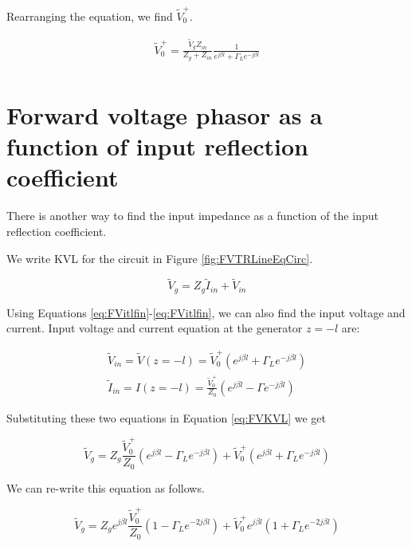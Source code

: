 \documentclass{ximera}
\begin{document}
Rearranging the equation, we find $\tilde{V}_0^+$.

\begin{eqnarray}
\tilde{V}_0^+= \frac{\tilde{V}_g Z_{in}}{Z_g + Z_{in}} \frac{1}{e^{j \beta l} + \Gamma_L e^{-j \beta l}} \\
\end{eqnarray}




\section{Forward voltage phasor as a function of input reflection coefficient}


There is another way to find the input impedance as a function of the input reflection coefficient.


We write KVL for the circuit in Figure \ref{fig:FVTRLineEqCirc}.

\begin{equation}
\tilde{V}_g=Z_g \tilde{I}_{in} + \tilde{V}_{in} \label{eq:FVKVL}
\end{equation}


Using Equations \ref{eq:FVitlfin}-\ref{eq:FVitlfin}, we can also find the input voltage and current.
Input voltage and current equation at the generator $z=-l$ are:


\begin{eqnarray}
\tilde{V}_{in}=\tilde{V}(z=-l)= \tilde{V}_0^+ (e^{j \beta l} + \Gamma_L  e^{-j \beta l } ) \\
\tilde{I}_{in}=I(z=-l)=   \frac{\tilde{V}_0^+}{Z_0}  (e^{j \beta l} - \Gamma  e^{-j \beta l}  ) 
\end{eqnarray}


Substituting these two equations in Equation \ref{eq:FVKVL} we get


\begin{equation}
\tilde{V}_g=Z_g \frac{\tilde{V}_0^+}{Z_0}  (e^{j \beta l} - \Gamma_L  e^{-j \beta l}  ) + \tilde{V}_0^+ (e^{j \beta l} + \Gamma_L  e^{-j \beta l } ) 
\end{equation}


We can re-write this equation as follows.



\begin{equation}
\tilde{V}_g=Z_g e^{j \beta l} \frac{\tilde{V}_0^+}{Z_0}  (1 - \Gamma_L  e^{-2j \beta l}  ) + \tilde{V}_0^+ e^{j \beta l} (1 + \Gamma_L  e^{-2j \beta l } ) 
\end{equation}
\end{document}
